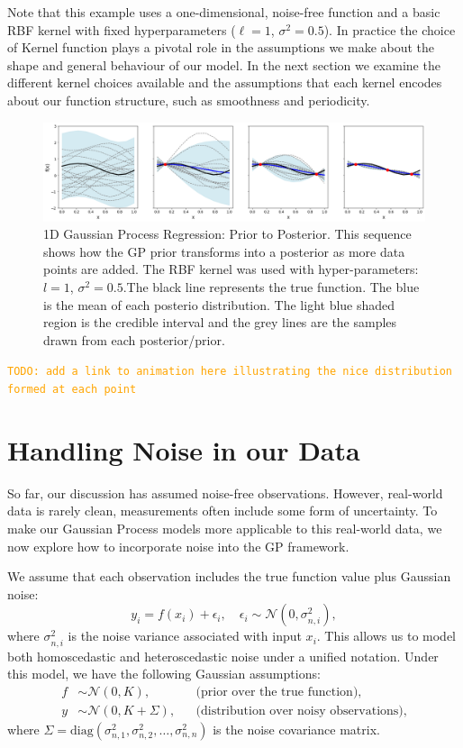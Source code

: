 \documentclass{ucdgradtaughtthesis}
\newcommand{\todo}[1]{\textcolor{orange}{\texttt{TODO: #1}}}
\begin{document}
Note that this example uses a one-dimensional, noise-free function and a basic RBF kernel with fixed hyperparameters (\(\ell = 1\), \(\sigma^2 = 0.5\)). 
In practice the choice of Kernel function plays a pivotal role in the assumptions we make about the shape and general behaviour of our model. In the next section
we examine the different kernel choices available and the assumptions that each kernel encodes about our function structure, such as smoothness and periodicity.


\begin{figure}[H]
    \centering
    \includegraphics[width=\textwidth]{LatexPlots/1dplots/priortoposterior.png}
    \caption[Building the posterior distribution]{1D Gaussian Process Regression: Prior to Posterior. This sequence shows how the GP prior transforms into a posterior as more data points are added. 
    The RBF kernel was used with hyper-parameters: $l = 1$, $\sigma^2 = 0.5$.The black line represents the true function. The blue is the mean of each posterio distribution. 
    The light blue shaded region is the credible interval and the grey lines are the samples drawn from each posterior/prior. }
    \label{fig: priortoposterior}
\end{figure}
\todo{add a  link to animation here illustrating the nice distribution formed at each point}




\section{Handling Noise in our Data}
\label{sec: Handlingnoise}
So far, our discussion has assumed noise-free observations. However, real-world data is rarely clean, measurements often include some form of uncertainty. To make our Gaussian Process models more applicable to this real-world data,
we now explore how to incorporate noise into the GP framework.
%

We assume that each observation includes the true function value plus Gaussian noise:
\begin{equation}
y_i = f(x_i) + \epsilon_i, \quad \epsilon_i \sim \mathcal{N}(0, \sigma_{n,i}^2),
\end{equation}
where \( \sigma_{n,i}^2 \) is the noise variance associated with input \( x_i \). This allows us to model both homoscedastic and heteroscedastic noise under a unified notation.
Under this model, we have the following Gaussian assumptions:
\begin{align}
f &\sim \mathcal{N}(0, K), &&\text{(prior over the true function)}, \\
y &\sim \mathcal{N}(0, K + \Sigma), &&\text{(distribution over noisy observations)},
\label{eq: prior_distribution_noise}
\end{align}
where \( \Sigma = \mathrm{diag}(\sigma_{n,1}^2, \sigma_{n,2}^2, \dots, \sigma_{n,n}^2) \) is the noise covariance matrix.
%
\end{document}

